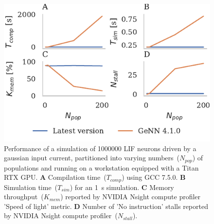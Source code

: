 \documentclass[9pt,twocolumn,twoside,lineno]{pnas-new}
\begin{document}
\begin{figure}
    \centering
    \includegraphics{figures/merging_scaling}
    \caption{Performance of a simulation of \num{1000000} LIF neurons driven by a gaussian input current, partitioned into varying numbers~($N_{pop}$) of populations and running on a workstation equipped with a Titan RTX GPU.
    \textbf{A} Compilation time~($T_{comp}$) using GCC 7.5.0.
    \textbf{B} Simulation time~($T_{sim}$) for an \SI{1}{\second} simulation.
    \textbf{C} Memory throughput~($K_{mem}$) reported by NVIDIA Nsight compute profiler 'Speed of light' metric.
    \textbf{D} Number of 'No instruction' stalls reported by NVIDIA Nsight compute profiler~($N_{stall}$).}
    \label{fig:merging_scaling}
\end{figure}
\end{document}
